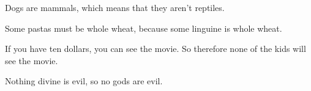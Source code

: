 \begin{exercises} 
\item Dogs are mammals, which means that they aren't reptiles.



\item Some pastas must be whole wheat, because some linguine is whole wheat.



\item If you have ten dollars, you can see the movie. So therefore none of the kids will see the movie. 



\item Nothing divine is evil, so no gods are evil.


\end{exercises}
